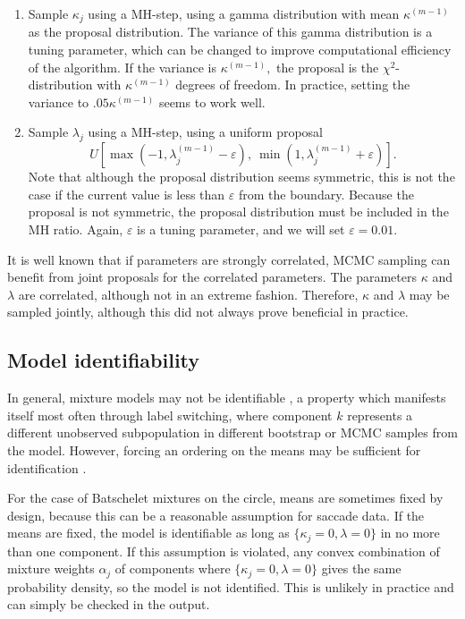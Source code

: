 \begin{enumerate}
\begin{enumerate}
    \item Sample $\kappa_j$ using a MH-step, using a gamma distribution with mean \(\kappa^{(m-1)}\) as the proposal distribution. The variance of this gamma distribution is a tuning parameter, which can be changed to improve computational efficiency of the algorithm. If the variance is \(\kappa^{(m-1)},\) the proposal is the \(\chi^2\)-distribution with \({\kappa^{(m-1)}}\) degrees of freedom. In practice, setting the variance to \(.05 {\kappa^{(m-1)}}\) seems to work well.

    \item Sample $\lambda_j$ using a MH-step, using a uniform proposal
    \begin{equation}
    U\left[\max(-1, \lambda^{(m - 1)}_j - \varepsilon), ~ \min(1, \lambda^{(m - 1)}_j + \varepsilon)\right].
    \end{equation}
    Note that although the proposal distribution seems symmetric, this is not the case if the current value is less than $\varepsilon$ from the boundary. Because the proposal is not symmetric, the proposal distribution must be included in the MH ratio. Again, \(\varepsilon\) is a tuning parameter, and we will set \(\varepsilon = 0.01.\)
\end{enumerate}
\end{enumerate}

It is well known that if parameters are strongly correlated, MCMC sampling can benefit from joint proposals for the correlated parameters. The parameters $\kappa$ and $\lambda$ are correlated, although not in an extreme fashion. Therefore, \(\kappa\) and \(\lambda\) may be sampled jointly, although this did not always prove beneficial in practice.

\subsection{Model identifiability} \label{sub:iden}

In general, mixture models may not be identifiable \citep{teicher1963identifiability}, a property which manifests itself most often through label switching, where component $k$ represents a different unobserved subpopulation in different bootstrap or MCMC samples from the model. However, forcing an ordering on the means may be sufficient for identification \citep{everitt2004mixture}.

For the case of Batschelet mixtures on the circle, means are sometimes fixed by design, because this can be a reasonable assumption for saccade data. If the means are fixed, the model is identifiable as long as \(\{\kappa_j = 0, \lambda = 0\}\) in no more than one component. If this assumption is violated, any convex combination of mixture weights $\alpha_j$ of components where \(\{\kappa_j = 0, \lambda = 0\}\) gives the same probability density, so the model is not identified. This is unlikely in practice and can simply be checked in the output.

